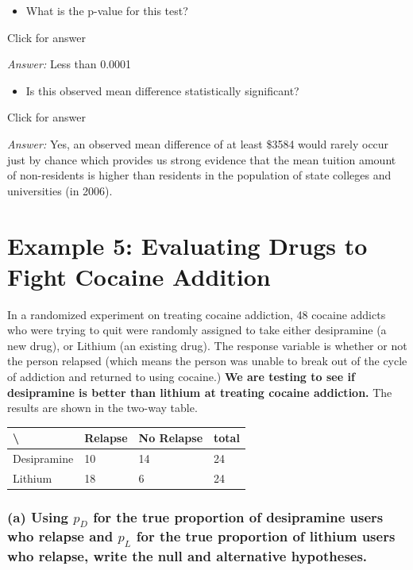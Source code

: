 \documentclass[
]{book}
\providecommand{\tightlist}{%
  \setlength{\itemsep}{0pt}\setlength{\parskip}{0pt}}
\begin{document}
\begin{itemize}
\tightlist
\item
  What is the p-value for this test?
\end{itemize}

Click for answer

\emph{Answer:} Less than 0.0001

\begin{itemize}
\tightlist
\item
  Is this observed mean difference statistically significant?
\end{itemize}

Click for answer

\emph{Answer:} Yes, an observed mean difference of at least \$3584 would rarely occur just by chance which provides us strong evidence that the mean tuition amount of non-residents is higher than residents in the population of state colleges and universities (in 2006).

\hypertarget{example-5-evaluating-drugs-to-fight-cocaine-addition}{%
\section{Example 5: Evaluating Drugs to Fight Cocaine Addition}\label{example-5-evaluating-drugs-to-fight-cocaine-addition}}

In a randomized experiment on treating cocaine addiction, 48 cocaine addicts who were trying to quit were randomly assigned to take either desipramine (a new drug), or Lithium (an existing drug). The response variable is whether or not the person relapsed (which means the person was unable to break out of the cycle of addiction and returned to using cocaine.) \textbf{We are testing to see if desipramine is better than lithium at treating cocaine addiction.} The results are shown in the two-way table.

\begin{longtable}[]{@{}llll@{}}
\toprule()
\textbackslash{} & Relapse & No Relapse & total \\
\midrule()
\endhead
Desipramine & 10 & 14 & 24 \\
Lithium & 18 & 6 & 24 \\
\bottomrule()
\end{longtable}

\hypertarget{a-using-p_d-for-the-true-proportion-of-desipramine-users-who-relapse-and-p_l-for-the-true-proportion-of-lithium-users-who-relapse-write-the-null-and-alternative-hypotheses.}{%
\subsubsection{\texorpdfstring{(a) Using \(p_D\) for the true proportion of desipramine users who relapse and \(p_L\) for the true proportion of lithium users who relapse, write the null and alternative hypotheses.}{(a) Using p\_D for the true proportion of desipramine users who relapse and p\_L for the true proportion of lithium users who relapse, write the null and alternative hypotheses.}}\label{a-using-p_d-for-the-true-proportion-of-desipramine-users-who-relapse-and-p_l-for-the-true-proportion-of-lithium-users-who-relapse-write-the-null-and-alternative-hypotheses.}}
\end{document}
